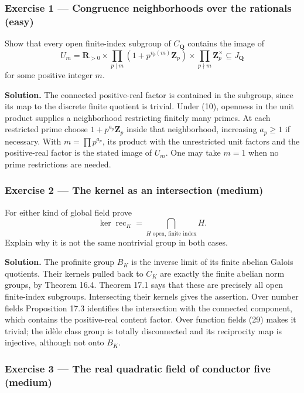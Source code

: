\documentclass[11pt,a4paper]{article}
\begin{document}
\subsubsection{Exercise 1 --- Congruence neighborhoods over the
rationals
(easy)}\label{exercise-1-congruence-neighborhoods-over-the-rationals-easy}

Show that every open finite-index subgroup of \(C_{\mathbf Q}\) contains
the image of \[
U_m=\mathbf R_{>0}\times
\prod_{p\mid m}(1+p^{v_p(m)}\mathbf Z_p)
\times\prod_{p\nmid m}\mathbf Z_p^\times
\subseteq J_{\mathbf Q}
\] for some positive integer \(m\).

\textbf{Solution.} The connected positive-real factor is contained in
the subgroup, since its map to the discrete finite quotient is trivial.
Under (10), openness in the unit product supplies a neighborhood
restricting finitely many primes. At each restricted prime choose
\(1+p^{a_p}\mathbf Z_p\) inside that neighborhood, increasing
\(a_p\geq1\) if necessary. With \(m=\prod p^{a_p}\), its product with
the unrestricted unit factors and the positive-real factor is the stated
image of \(U_m\). One may take \(m=1\) when no prime restrictions are
needed.

\subsubsection{Exercise 2 --- The kernel as an intersection
(medium)}\label{exercise-2-the-kernel-as-an-intersection-medium}

For either kind of global field prove \[
\ker\operatorname{rec}_K=\bigcap_{H\text{ open, finite index}}H.
\] Explain why it is not the same nontrivial group in both cases.

\textbf{Solution.} The profinite group \(B_K\) is the inverse limit of
its finite abelian Galois quotients. Their kernels pulled back to
\(C_K\) are exactly the finite abelian norm groups, by Theorem 16.4.
Theorem 17.1 says that these are precisely all open finite-index
subgroups. Intersecting their kernels gives the assertion. Over number
fields Proposition 17.3 identifies the intersection with the connected
component, which contains the positive-real content factor. Over
function fields (29) makes it trivial; the idèle class group is totally
disconnected and its reciprocity map is injective, although not onto
\(B_K\).

\subsubsection{Exercise 3 --- The real quadratic field of conductor five
(medium)}\label{exercise-3-the-real-quadratic-field-of-conductor-five-medium}
\end{document}
